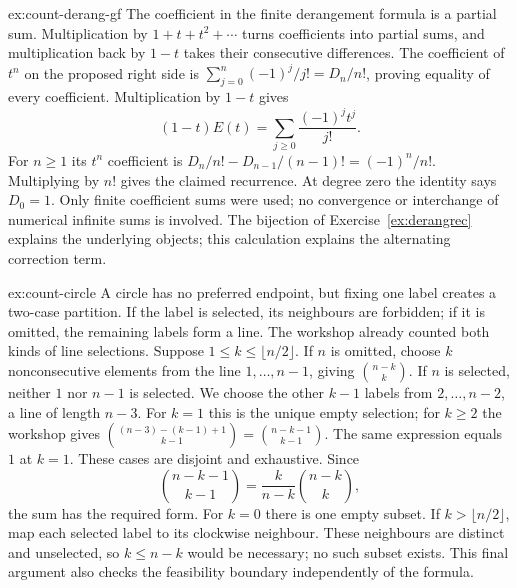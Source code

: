 \begin{solution}{ex:count-derang-gf}
\idea The coefficient in the finite derangement formula is a partial sum. Multiplication by $1+t+t^2+\cdots$ turns coefficients into partial sums, and multiplication back by $1-t$ takes their consecutive differences.
\writeup The coefficient of $t^n$ on the proposed right side is $\sum_{j=0}^n(-1)^j/j!=D_n/n!$, proving equality of every coefficient. Multiplication by $1-t$ gives
\[
(1-t)E(t)=\sum_{j\ge0}\frac{(-1)^jt^j}{j!}.
\]
For $n\ge1$ its $t^n$ coefficient is $D_n/n!-D_{n-1}/(n-1)!=(-1)^n/n!$. Multiplying by $n!$ gives the claimed recurrence. At degree zero the identity says $D_0=1$. Only finite coefficient sums were used; no convergence or interchange of numerical infinite sums is involved. The bijection of Exercise~\ref{ex:derangrec} explains the underlying objects; this calculation explains the alternating correction term.
\end{solution}

\begin{solution}{ex:count-circle}
\idea A circle has no preferred endpoint, but fixing one label creates a two-case partition. If the label is selected, its neighbours are forbidden; if it is omitted, the remaining labels form a line. The workshop already counted both kinds of line selections.
\writeup Suppose $1\le k\le\lfloor n/2\rfloor$. If $n$ is omitted, choose $k$ nonconsecutive elements from the line $1,\dots,n-1$, giving $\binom{n-k}{k}$. If $n$ is selected, neither $1$ nor $n-1$ is selected. We choose the other $k-1$ labels from $2,\dots,n-2$, a line of length $n-3$. For $k=1$ this is the unique empty selection; for $k\ge2$ the workshop gives $\binom{(n-3)-(k-1)+1}{k-1}=\binom{n-k-1}{k-1}$. The same expression equals $1$ at $k=1$. These cases are disjoint and exhaustive. Since
\[
\binom{n-k-1}{k-1}=\frac{k}{n-k}\binom{n-k}{k},
\]
the sum has the required form. For $k=0$ there is one empty subset. If $k>\lfloor n/2\rfloor$, map each selected label to its clockwise neighbour. These neighbours are distinct and unselected, so $k\le n-k$ would be necessary; no such subset exists. This final argument also checks the feasibility boundary independently of the formula.
\end{solution}

